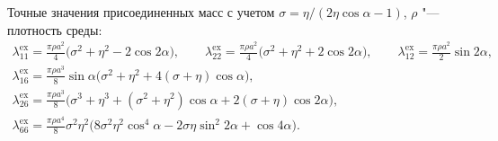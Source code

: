 \documentclass[ignoreonframetext,unicode]{beamer}
\begin{document}
\begin{frame}
	Точные значения присоединенных масс с учетом $\sigma = \eta/(2\eta\cos\alpha - 1)$, $\rho$ "--- плотность среды:
	\begin{gather*}
	\lambda^{\mathrm{ex}}_{11} = \frac{\pi \rho a^2}{4}\bigl(\sigma^2 + \eta^2 - 2\cos2\alpha\bigr), \qquad
	\lambda^{\mathrm{ex}}_{22} = \frac{\pi \rho a^2}{4}\bigl(\sigma^2 + \eta^2 + 2\cos2\alpha\bigr), \qquad
	\lambda^{\mathrm{ex}}_{12} = \frac{\pi \rho a^2}{2}\sin 2\alpha, \\
	\lambda^{\mathrm{ex}}_{16} = \frac{\pi \rho a^3}{8} \sin\alpha \bigl( \sigma^2 + \eta^2 + 4(\sigma+\eta)\cos\alpha \bigr), \\
	\lambda^{\mathrm{ex}}_{26} = \frac{\pi \rho a^3}{8} \bigl( \sigma^3 + \eta^3 + ( \sigma^2 + \eta^2)\cos\alpha  + 2(\sigma+\eta)\cos2\alpha \bigr),\\
	\lambda^{\mathrm{ex}}_{66} = \frac{\pi \rho a^4}{8} \sigma^2 \eta^2 \bigl( 8\sigma^2 \eta^2 \cos^4\alpha - 2 \sigma \eta \sin^2 2\alpha + \cos4\alpha \bigr).
	\end{gather*}
\end{frame}


	
\end{document}

